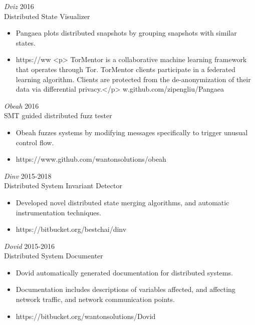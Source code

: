 \documentclass[line,margin]{res}
\begin{document}
\begin{resume}
{{\sl Dviz} \hfill 2016\\
    Distributed State Visualizer
\begin{itemize} \itemsep -2pt
        \item Pangaea plots distributed snapshots by grouping snapshots with similar states.
        \item https://ww            <p> TorMentor is a collaborative machine learning framework that operates through Tor. TorMentor clients participate in a federated learning algorithm. Clients are protected from the de-anonymization of their data via differential privacy.</p>
w.github.com/zipengliu/Pangaea
\end{itemize}

{\sl Obeah} \hfill 2016\\
    SMT guided distributed fuzz tester
\begin{itemize} \itemsep -2pt
        \item Obeah fuzzes systems by modifying messages specifically to trigger unusual control flow.
        \item https://www.github.com/wantonsolutions/obeah
\end{itemize}

{\sl Dinv} \hfill 2015-2018\\
    Distributed System Invariant Detector
\begin{itemize} \itemsep -2pt
        \item Developed novel distributed state merging algorithms, and automatic instrumentation techniques.
        \item https://bitbucket.org/bestchai/dinv
\end{itemize}

{\sl Dovid} \hfill 2015-2016\\
    Distributed System Documenter
\begin{itemize} \itemsep -2pt
        \item Dovid automatically generated documentation for distributed systems.
        \item Documentation includes descriptions of variables affected, and affecting network traffic, and network communication points.
        \item https://bitbucket.org/wantonsolutions/Dovid
\end{itemize}

}
\end{resume}
\end{document}
